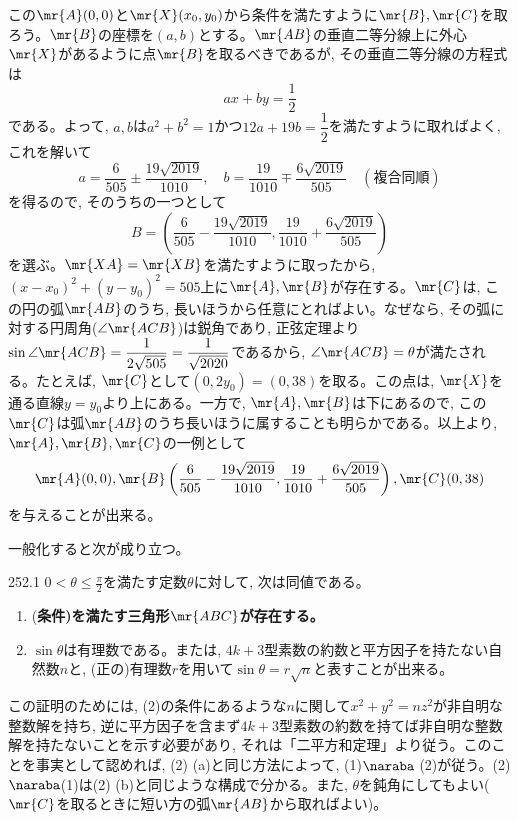 この$\mr{A}(0,0)$と$\mr{X}(x_0,y_0)$から条件を満たすように$\mr{B},\mr{C}$を取ろう。$\mr{B}$の座標を$(a,b)$とする。$\mr{AB}$の垂直二等分線上に外心$\mr{X}$があるように点$\mr{B}$を取るべきであるが, その垂直二等分線の方程式は
\[ax+by = \dfrac{1}{2}\]
である。よって, $a,b$は$a^2 + b^2 = 1$かつ$12a + 19b=\dfrac{1}{2}$を満たすように取ればよく, これを解いて
\[a= \frac{6}{505} \pm \frac{19\sqrt{2019}}{1010},\quad b=\frac{19}{1010}\mp \frac{6\sqrt{2019}}{505}\quad (複合同順)\]
を得るので, そのうちの一つとして
\[B = \left(\frac{6}{505} - \frac{19\sqrt{2019}}{1010},\frac{19}{1010}+ \frac{6\sqrt{2019}}{505}\right) \]
を選ぶ。$\mr{XA} = \mr{XB}$を満たすように取ったから, $(x-x_0)^2 + (y-y_0)^2 = 505$上に$\mr{A},\mr{B}$が存在する。$\mr{C}$は, この円の弧$\mr{AB}$のうち, 長いほうから任意にとればよい。なぜなら, その弧に対する円周角($\angle{\mr{ACB}}$)は鋭角であり, 正弦定理より$\sin{\angle{\mr{ACB}}} = \dfrac{1}{2\sqrt{505}} =\dfrac{1}{\sqrt{2020}}$であるから, $\angle{\mr{ACB}} = \theta$が満たされる。たとえば, $\mr{C}$として$(0,2y_0) = (0,38)$を取る。この点は, $\mr{X}$を通る直線$y=y_0$より上にある。一方で, $\mr{A},\mr{B}$は下にあるので, この$\mr{C}$は弧$\mr{AB}$のうち長いほうに属することも明らかである。以上より, $\mr{A},\mr{B},\mr{C}$の一例として
\[ \mr{A}(0,0), \mr{B}\left(\dfrac{6}{505} - \dfrac{19\sqrt{2019}}{1010},\dfrac{19}{1010}+ \dfrac{6\sqrt{2019}}{505}\right), \mr{C}(0,38)\]
を与えることが出来る。

一般化すると次が成り立つ。
\begin{subthm}{252.1}
$0< \theta  \leq \frac{\pi}{2}$を満たす定数$\theta$に対して, 次は同値である。
 \begin{enumerate}
  \item (\bf{条件})を満たす三角形$\mr{ABC}$が存在する。
  \item $\sin{\theta}$は有理数である。または, $4k+3$型素数の約数と平方因子を持たない自然数$n$と, (正の)有理数$r$を用いて$\sin{\theta} = r\sqrt{n}$と表すことが出来る。
 \end{enumerate}
\end{subthm}
この証明のためには, (2)の条件にあるような$n$に関して$x^2 + y^2 = nz^2$が非自明な整数解を持ち, 逆に平方因子を含まず$4k+3$型素数の約数を持てば非自明な整数解を持たないことを示す必要があり, それは「二平方和定理」より従う。このことを事実として認めれば, (2) (a)と同じ方法によって, (1)$\naraba$ (2)が従う。(2)$\naraba$(1)は(2) (b)と同じような構成で分かる。また, $\theta$を鈍角にしてもよい($\mr{C}$を取るときに短い方の弧$\mr{AB}$から取ればよい)。
